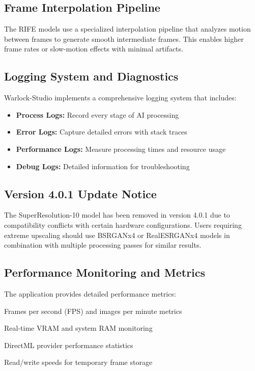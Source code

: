 \documentclass[11pt, a4paper]{article}
\begin{document}
\subsection{Frame Interpolation Pipeline}
The RIFE models use a specialized interpolation pipeline that analyzes motion between frames to generate smooth intermediate frames. This enables higher frame rates or slow-motion effects with minimal artifacts.

\subsection{Logging System and Diagnostics}
Warlock-Studio implements a comprehensive logging system that includes:
\begin{itemize}[leftmargin=*]
    \item \textbf{Process Logs:} Record every stage of AI processing
    \item \textbf{Error Logs:} Capture detailed errors with stack traces
    \item \textbf{Performance Logs:} Measure processing times and resource usage
    \item \textbf{Debug Logs:} Detailed information for troubleshooting
\end{itemize}

\subsection{Version 4.0.1 Update Notice}
\begin{warnbox}
The SuperResolution-10 model has been removed in version 4.0.1 due to compatibility conflicts with certain hardware configurations. Users requiring extreme upscaling should use BSRGANx4 or RealESRGANx4 models in combination with multiple processing passes for similar results.
\end{warnbox}

\subsection{Performance Monitoring and Metrics}
The application provides detailed performance metrics:
\begin{description}[leftmargin=*, style=nextline]
    \item[Processing Speed:] Frames per second (FPS) and images per minute metrics
    \item[Memory Usage:] Real-time VRAM and system RAM monitoring
    \item[GPU Utilization:] DirectML provider performance statistics
    \item[Disk I/O:] Read/write speeds for temporary frame storage
\end{description}
\end{document}
